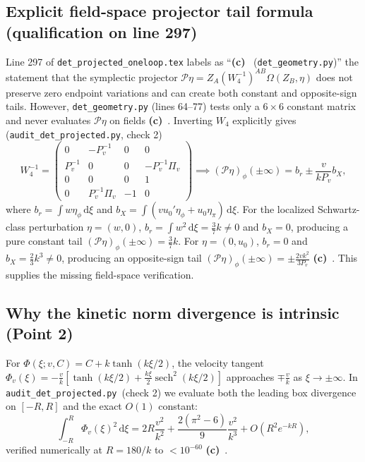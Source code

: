 \documentclass[11pt,a4paper]{article}
\newcommand{\Lc}{\textsf{\textbf{(c)}}\ }
\newcommand{\scr}{\texttt{audit\_\allowbreak det\_\allowbreak projected.py}}
\newcommand{\dd}{\mathrm d}
\begin{document}
\subsection{Explicit field-space projector tail formula (qualification on line 297)}
Line 297 of \texttt{det\_projected\_oneloop.tex} labels as ``\Lc
(\texttt{det\_geometry.py})'' the statement that the symplectic projector
$\mathcal P\eta=Z_A(W_4^{-1})^{AB}\Omega(Z_B,\eta)$ does not preserve zero
endpoint variations and can create both constant and opposite-sign tails.
However, \texttt{det\_geometry.py} (lines 64--77) tests only a $6\times6$
constant matrix and never evaluates $\mathcal P\eta$ on fields \Lc.
Inverting $W_4$ explicitly gives (\scr, check 2)
\begin{equation}\label{eq:Winv_tails}
 W_4^{-1}=\begin{pmatrix}
  0&-P_v^{-1}&0&0\\
  P_v^{-1}&0&0&-P_v^{-1}\Pi_v\\
  0&0&0&1\\
  0&P_v^{-1}\Pi_v&-1&0
 \end{pmatrix}
 \implies
 (\mathcal P\eta)_\phi(\pm\infty)=b_r\pm\frac{v}{kP_v}b_X,
\end{equation}
where $b_r=\int w\eta_\phi\,\dd\xi$ and
$b_X=\int(vu_0'\eta_\phi+u_0\eta_\pi)\,\dd\xi$. For the localized Schwartz-class
perturbation $\eta=(w,0)$, $b_r=\int w^2\,\dd\xi=\tfrac37k\ne0$ and $b_X=0$,
producing a pure constant tail $(\mathcal P\eta)_\phi(\pm\infty)=\tfrac37k$.
For $\eta=(0,u_0)$, $b_r=0$ and $b_X=\tfrac23k^3\ne0$, producing an opposite-sign
tail $(\mathcal P\eta)_\phi(\pm\infty)=\pm\tfrac{2vk^2}{3P_v}$ \Lc. This supplies
the missing field-space verification.

\subsection{Why the kinetic norm divergence is intrinsic (Point 2)}
For $\Phi(\xi;v,C)=C+k\tanh(k\xi/2)$, the velocity tangent
$\Phi_v(\xi)=-\frac{v}{k}[\tanh(k\xi/2)+\frac{k\xi}{2}\operatorname{sech}^2(k\xi/2)]$
approaches $\mp\frac{v}{k}$ as $\xi\to\pm\infty$. In \scr\ (check 2) we evaluate
both the leading box divergence on $[-R,R]$ and the exact $O(1)$ constant:
\begin{equation}\label{eq:phiv_norm_exact}
 \int_{-R}^R \Phi_v(\xi)^2\,\dd\xi
 = 2R\frac{v^2}{k^2} + \frac{2(\pi^2-6)}{9}\frac{v^2}{k^3} + O(R^2e^{-kR}),
\end{equation}
verified numerically at $R=180/k$ to $<10^{-60}$ \Lc.
\end{document}
